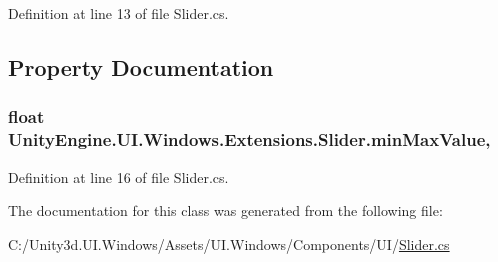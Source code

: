 Definition at line 13 of file Slider.\+cs.



\subsection{Property Documentation}
\hypertarget{class_unity_engine_1_1_u_i_1_1_windows_1_1_extensions_1_1_slider_a70fcbd7a720f6e546ab4df5b7fcae9cc}{}
\subsubsection[{min\+Max\+Value}]{\setlength{\rightskip}{0pt plus 5cm}float Unity\+Engine.\+U\+I.\+Windows.\+Extensions.\+Slider.\+min\+Max\+Value\hspace{0.3cm}{\ttfamily [get]}, {\ttfamily [set]}}\label{class_unity_engine_1_1_u_i_1_1_windows_1_1_extensions_1_1_slider_a70fcbd7a720f6e546ab4df5b7fcae9cc}


Definition at line 16 of file Slider.\+cs.



The documentation for this class was generated from the following file\+:\begin{DoxyCompactItemize}
\item 
C\+:/\+Unity3d.\+U\+I.\+Windows/\+Assets/\+U\+I.\+Windows/\+Components/\+U\+I/\hyperlink{_slider_8cs}{Slider.\+cs}\end{DoxyCompactItemize}
